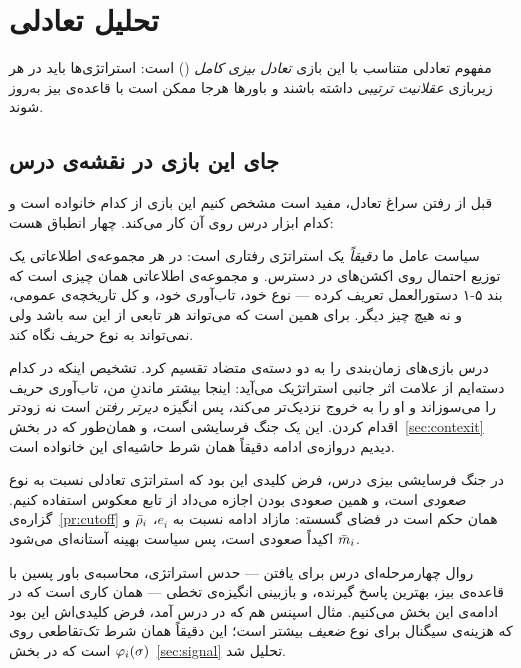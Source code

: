 \documentclass[12pt,a4paper]{article}
\begin{document}
\section{تحلیل تعادلی}\label{sec:equilibrium}

مفهوم تعادلی متناسب با این بازی \emph{تعادل بیزی کامل} () است:
استراتژی‌ها باید در هر زیربازی \emph{عقلانیت ترتیبی} داشته باشند و باورها
هرجا ممکن است با قاعده‌ی بیز به‌روز شوند.

\subsection{جای این بازی در نقشه‌ی درس}

قبل از رفتن سراغ تعادل، مفید است مشخص کنیم این بازی از کدام خانواده است و
کدام ابزار درس روی آن کار می‌کند. چهار انطباق هست:

\begin{description}[leftmargin=1.2em,itemsep=4pt]
  \item[\normalfont\textbf{فرم گسترده و استراتژی رفتاری (جلسه‌ی دهم).}]
        سیاست عامل ما \emph{دقیقاً} یک استراتژی رفتاری است: در هر مجموعه‌ی
        اطلاعاتی یک توزیع احتمال روی اکشن‌های در دسترس. و مجموعه‌ی اطلاعاتی
        همان چیزی است که بند ۵-۱ دستورالعمل تعریف کرده — نوع خود، تاب‌آوری
        خود، و کل تاریخچه‌ی عمومی، و نه هیچ چیز دیگر. برای همین است که
         می‌تواند هر تابعی از این سه باشد ولی نمی‌تواند
        به نوع حریف نگاه کند.
  \item[\normalfont\textbf{بازی زمان‌بندی، از نوع فرسایشی نه پیش‌دستی
        (جلسه‌ی یازدهم).}]
        درس بازی‌های زمان‌بندی را به دو دسته‌ی متضاد تقسیم کرد. تشخیص اینکه
        در کدام دسته‌ایم از علامت اثر جانبی استراتژیک می‌آید: اینجا بیشتر
        ماندنِ من، تاب‌آوری حریف را می‌سوزاند و او را به خروج نزدیک‌تر
        می‌کند، پس انگیزه \emph{دیرتر رفتن} است نه زودتر اقدام کردن. این
        یک جنگ فرسایشی است، و همان‌طور که در بخش~\ref{sec:contexit} دیدیم
        دروازه‌ی ادامه دقیقاً همان شرط حاشیه‌ای این خانواده است.
  \item[\normalfont\textbf{نسخه‌ی بیزی با نوع پیوسته (جلسه‌ی هفتم).}]
        در جنگ فرسایشی بیزی درس، فرض کلیدی این بود که استراتژی تعادلی نسبت
        به نوع \emph{صعودی} است، و همین صعودی بودن اجازه می‌داد از تابع
        معکوس استفاده کنیم. گزاره‌ی~\ref{pr:cutoff} همان حکم است در فضای
        گسسته: مازاد ادامه نسبت به $e_i$، $\bar{\rho}_i$ و $\bar{m}_i$ اکیداً
        صعودی است، پس سیاست بهینه آستانه‌ای می‌شود.
  \item[\normalfont\textbf{سیگنال‌دهی و \lr{PBE} (جلسه‌ی دوازدهم).}]
        روال چهارمرحله‌ای درس برای یافتن  — حدس استراتژی، محاسبه‌ی
        باور پسین با قاعده‌ی بیز، بهترین پاسخ گیرنده، و بازبینی انگیزه‌ی
        تخطی — همان کاری است که در ادامه‌ی این بخش می‌کنیم. مثال اسپنس هم
        که در درس آمد، فرض کلیدی‌اش این بود که هزینه‌ی سیگنال برای نوع
        \emph{ضعیف} بیشتر است؛ این دقیقاً همان شرط تک‌تقاطعی روی
        $\varphi_i(\sigma)$ است که در بخش~\ref{sec:signal} تحلیل شد.
\end{description}
\end{document}
